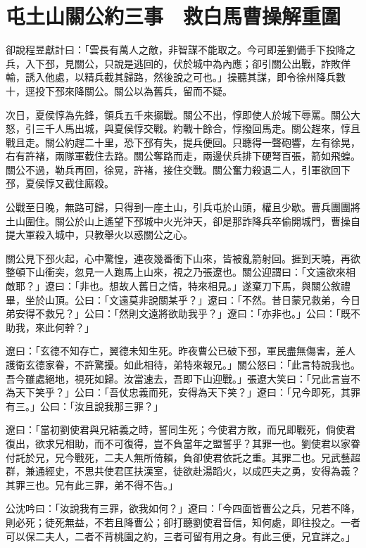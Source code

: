 
\chapter{屯土山關公約三事　救白馬曹操解重圍}

卻說程昱獻計曰：「雲長有萬人之敵，非智謀不能取之。今可即差劉備手下投降之兵，入下邳，見關公，只說是逃回的，伏於城中為內應；卻引關公出戰，詐敗佯輸，誘入他處，以精兵截其歸路，然後說之可也。」操聽其謀，即令徐州降兵數十，逕投下邳來降關公。關公以為舊兵，留而不疑。

次日，夏侯惇為先鋒，領兵五千來搦戰。關公不出，惇即使人於城下辱罵。關公大怒，引三千人馬出城，與夏侯惇交戰。約戰十餘合，惇撥回馬走。關公趕來，惇且戰且走。關公約趕二十里，恐下邳有失，提兵便回。只聽得一聲砲響，左有徐晃，右有許褚，兩隊軍截住去路。關公奪路而走，兩邊伏兵排下硬弩百張，箭如飛蝗。關公不過，勒兵再回，徐晃，許褚，接住交戰。關公奮力殺退二人，引軍欲回下邳，夏侯惇又截住廝殺。

公戰至日晚，無路可歸，只得到一座土山，引兵屯於山頭，權且少歇。曹兵團團將土山圍住。關公於山上遙望下邳城中火光沖天，卻是那詐降兵卒偷開城門，曹操自提大軍殺入城中，只教舉火以惑關公之心。

關公見下邳火起，心中驚惶，連夜幾番衝下山來，皆被亂箭射回。捱到天曉，再欲整頓下山衝突，忽見一人跑馬上山來，視之乃張遼也。關公迎謂曰：「文遠欲來相敵耶？」遼曰：「非也。想故人舊日之情，特來相見。」遂棄刀下馬，與關公敘禮畢，坐於山頂。公曰：「文遠莫非說關某乎？」遼曰：「不然。昔日蒙兄救弟，今日弟安得不救兄？」公曰：「然則文遠將欲助我乎？」遼曰：「亦非也。」公曰：「既不助我，來此何幹？」

遼曰：「玄德不知存亡，翼德未知生死。昨夜曹公已破下邳，軍民盡無傷害，差人護衛玄德家眷，不許驚擾。如此相待，弟特來報兄。」關公怒曰：「此言特說我也。吾今雖處絕地，視死如歸。汝當速去，吾即下山迎戰。」張遼大笑曰：「兄此言豈不為天下笑乎？」公曰：「吾仗忠義而死，安得為天下笑？」遼曰：「兄今即死，其罪有三。」公曰：「汝且說我那三罪？」

遼曰：「當初劉使君與兄結義之時，誓同生死；今使君方敗，而兄即戰死，倘使君復出，欲求兄相助，而不可復得，豈不負當年之盟誓乎？其罪一也。劉使君以家眷付託於兄，兄今戰死，二夫人無所倚賴，負卻使君依託之重。其罪二也。兄武藝超群，兼通經史，不思共使君匡扶漢室，徒欲赴湯蹈火，以成匹夫之勇，安得為義？其罪三也。兄有此三罪，弟不得不告。」

公沈吟曰：「汝說我有三罪，欲我如何？」遼曰：「今四面皆曹公之兵，兄若不降，則必死；徒死無益，不若且降曹公；卻打聽劉使君音信，知何處，即往投之。一者可以保二夫人，二者不背桃園之約，三者可留有用之身。有此三便，兄宜詳之。」

